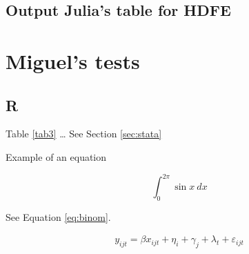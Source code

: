 \documentclass[
  12pt,
]{article}
\begin{document}
\hypertarget{output-julias-table-for-hdfe}{%
\subsection{Output Julia's table for HDFE}\label{output-julias-table-for-hdfe}}

\begin{table}[ht]
\label{tab:hdfe}
  
\end{table}

\hypertarget{miguels-tests}{%
\section{Miguel's tests}\label{miguels-tests}}

\hypertarget{r}{%
\subsection{R}\label{r}}

Table \ref{tab3} \ldots{} See Section \ref{sec:stata}

Example of an equation

\[\int_0^{2\pi} \sin x~dx\]

See Equation \eqref{eq:binom}.

\begin{align}
y_{ijt} = \beta x_{ijt} + \eta_i + \gamma_j + \lambda_t + \varepsilon_{ijt}
\end{align}
\end{document}
